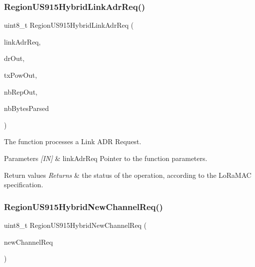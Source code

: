 \subsubsection{\texorpdfstring{Region\+U\+S915\+Hybrid\+Link\+Adr\+Req()}{RegionUS915HybridLinkAdrReq()}}
{\footnotesize\ttfamily uint8\+\_\+t Region\+U\+S915\+Hybrid\+Link\+Adr\+Req (\begin{DoxyParamCaption}\item[{\hyperlink{group__REGION_gad4af503e8d4de1846129e26a799a1e8e}{Link\+Adr\+Req\+Params\+\_\+t} $\ast$}]{link\+Adr\+Req,  }\item[{int8\+\_\+t $\ast$}]{dr\+Out,  }\item[{int8\+\_\+t $\ast$}]{tx\+Pow\+Out,  }\item[{uint8\+\_\+t $\ast$}]{nb\+Rep\+Out,  }\item[{uint8\+\_\+t $\ast$}]{nb\+Bytes\+Parsed }\end{DoxyParamCaption})}



The function processes a Link A\+DR Request. 


\begin{DoxyParams}{Parameters}
{\em \mbox{[}\+I\+N\mbox{]}} & link\+Adr\+Req Pointer to the function parameters.\\
\hline
\end{DoxyParams}

\begin{DoxyRetVals}{Return values}
{\em Returns} & the status of the operation, according to the Lo\+Ra\+M\+AC specification. \\
\hline
\end{DoxyRetVals}
\mbox{\label{group__REGIONUS915HYB_ga8555b0827350263310c34afbb060842e}} 
\subsubsection{\texorpdfstring{Region\+U\+S915\+Hybrid\+New\+Channel\+Req()}{RegionUS915HybridNewChannelReq()}}
{\footnotesize\ttfamily uint8\+\_\+t Region\+U\+S915\+Hybrid\+New\+Channel\+Req (\begin{DoxyParamCaption}\item[{\hyperlink{group__REGION_gae2abcdb6dbb843c9faf5fd3009eca9d6}{New\+Channel\+Req\+Params\+\_\+t} $\ast$}]{new\+Channel\+Req }\end{DoxyParamCaption})}



